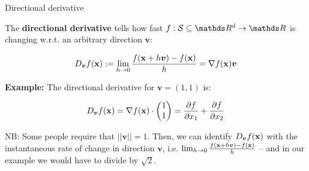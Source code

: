 \documentclass[11pt,compress,t,notes=noshow, xcolor=table]{beamer}
\begin{document}
\begin{vbframe}{Directional derivative}

The \textbf{directional derivative} tells how fast $f: \mathcal{S}\subseteq \R^d \to \R$ is changing w.r.t. an arbitrary direction $\bm{v}$:

 $$
   D_{\bm{v}} f(\mathbf{x}) := \lim_{h \to 0} \frac{f(\mathbf{x} + h \bm v) - f(\mathbf{x})}{h} = \nabla f(\mathbf{x}) \bm v
 $$


\textbf{Example: } The directional derivative for $\bm{v} = (1, 1)$ is:

$$
D_{\bm{v}} f(\mathbf{x}) = \nabla f(\mathbf{x}) \cdot \begin{pmatrix} 1 \\1\end{pmatrix} = \frac{\partial f}{\partial x_1} + \frac{\partial f}{\partial x_2}
$$

NB: Some people require that $||\bm{v}|| = 1$. Then, we can identify $D_{\bm{v}} f(\mathbf{x})$ with the instantaneous rate of change in direction $\bm{v}$, i.e. $\lim_{h \to 0} \frac{f(\mathbf{x} + h \bm v) - f(\mathbf{x})}{h}$ -- and in our example we would have to divide by $\sqrt{2}$.

\end{vbframe}
\end{document}
